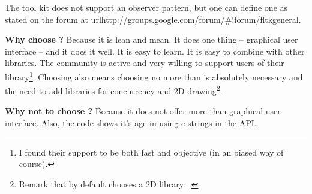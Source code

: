 The tool kit  does not support an observer pattern, but one can 
define one as stated on the forum at url{http://groups.google.com/forum/\#!forum/fltkgeneral}.

\textbf{Why choose ?} Because it is lean and mean. It does one thing -- 
graphical user interface -- and it does it well. It is easy to learn. 
It is easy to combine with other libraries. The community is active and very willing 
to support users of their library\footnote{I found their support to be both fast 
and objective (in an  biased way of course).}. Choosing  also means 
choosing no more than is absolutely necessary and the need to add libraries 
for concurrency and 2D drawing\footnote{Remark that  by default 
chooses a 2D library: .}.

\textbf{Why not to choose ?} Because it does not offer more than graphical 
user interface. Also, the code shows it's age in using c-strings in the API.
